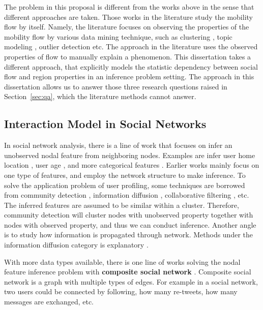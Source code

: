 The problem in this proposal is different from the works above in the sense that different approaches are taken. Those works in the literature study the mobility flow by itself. Namely, the literature focuses on observing the properties of the mobility flow by various data mining technique, such as clustering \cite{berlingerio2013allaboard}, topic modeling \cite{yuan2012discovering}, outlier detection \cite{zheng2011urban} etc.  The approach in the literature uses the observed properties of flow to manually explain a phenomenon. This dissertation takes a different approach, that explicitly models the statistic dependency between social flow and region properties in an inference problem setting. The approach in this dissertation allows us to answer those three research questions raised in Section~\ref{sec:qa}, which the literature methods cannot answer.





\subsection{Interaction Model in Social Networks}


In social network analysis, there is a line of work that focuses on infer an unobserved  nodal feature from neighboring nodes. Examples are infer user home location \cite{Pontes:2012:WKY:2370216.2370419, Li:2012:TSU:2339530.2339692}, user age \cite{6195711}, and more categorical features \cite{Mislove:2010:YYK:1718487.1718519}. Earlier works mainly focus on one type of features, and employ the network structure to make inference. To solve the application problem of user profiling, some techniques are borrowed from community detection \cite{fortunato2010community}, information diffusion \cite{guille2013information}, collaborative filtering \cite{breese1998empirical}, etc. The inferred features are assumed to be similar within a cluster. Therefore, community detection will cluster nodes with unobserved property together with nodes with observed property, and thus we can conduct inference. Another angle is to study how information is propagated through network. Methods under the information diffusion category is explanatory \cite{rodriguez2011uncovering, gomez2010inferring}.


With more data types available, there is one line of works solving the nodal feature inference problem with \textbf{composite social network} \cite{pan2011composite, madan2011pervasive,zhong2012comsoc}. Composite social network is a graph with multiple types of edges. For example in a social network, two users could be connected by following, how many re-tweets, how many messages are exchanged, etc. 


